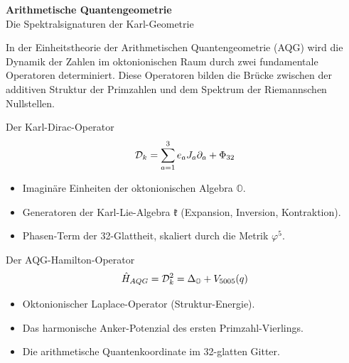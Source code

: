 \documentclass[12pt,a4paper]{article}
\begin{document}
	
	\pagestyle{empty} %
	
	\begin{center}
		{\Huge \textbf{Arithmetische Quantengeometrie}} \\[0.5cm]
		{\Large Die Spektralsignaturen der Karl-Geometrie} \\[1.5cm]
	\end{center}
	
	\noindent
	In der Einheitstheorie der Arithmetischen Quantengeometrie (AQG) wird die Dynamik der Zahlen im oktonionischen Raum durch zwei fundamentale Operatoren determiniert. Diese Operatoren bilden die Brücke zwischen der additiven Struktur der Primzahlen und dem Spektrum der Riemannschen Nullstellen.
	
	\vspace{1cm}
	
	\begin{mathframe}{Der Karl-Dirac-Operator}
		\vspace{0.3cm}
		\begin{equation*}
			\huge \mathcal{D}_k = \sum_{a=1}^{3} e_a J_a \partial_a + \Phi_{32}
		\end{equation*}
		\vspace{0.1cm}
	\end{mathframe}
	
	\begin{itemize}
		\item[$e_a$] Imaginäre Einheiten der oktonionischen Algebra $\mathbb{O}$.
		\item[$J_a$] Generatoren der Karl-Lie-Algebra $\mathfrak{k}$ (Expansion, Inversion, Kontraktion).
		\item[$\Phi_{32}$] Phasen-Term der 32-Glattheit, skaliert durch die Metrik $\varphi^5$.
	\end{itemize}
	
	\vspace{2cm}
	
	\begin{mathframe}{Der AQG-Hamilton-Operator}
		\vspace{0.3cm}
		\begin{equation*}
			\huge \hat{H}_{AQG} = \mathcal{D}_k^2 = \Delta_{\mathbb{O}} + V_{5005}(q)
		\end{equation*}
		\vspace{0.1cm}
	\end{mathframe}
	
	\begin{itemize}
		\item[$\Delta_{\mathbb{O}}$] Oktonionischer Laplace-Operator (Struktur-Energie).
		\item[$V_{5005}$] Das harmonische Anker-Potenzial des ersten Primzahl-Vierlings.
		\item[$q$] Die arithmetische Quantenkoordinate im 32-glatten Gitter.
	\end{itemize}
	
\end{document}
